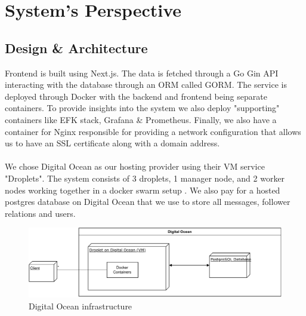 \section{System's Perspective}

\subsection{Design \& Architecture}
Frontend is built using Next.js\cite{nextjs}. The data is fetched through a Go Gin\cite{gin-gonic} API interacting with the database through an ORM called GORM\cite{gorm}. The service is deployed through Docker with the backend and frontend being separate containers. To provide insights into the system we also deploy "supporting" containers like EFK stack, Grafana \& Prometheus. Finally, we also have a container for Nginx responsible for providing a network configuration that allows us to have an SSL certificate along with a domain address.
\\\\
We chose Digital Ocean as our hosting provider using their VM service "Droplets". The system consists of 3 droplets, 1 manager node, and 2 worker nodes working together in a docker swarm setup . We also pay for a hosted postgres database on Digital Ocean that we use to store all messages, follower relations and users. 

\begin{figure}[h!]
    \centering
    \includegraphics[scale=0.6]{diagrams/infrastructure.pdf}
    \caption{Digital Ocean infrastructure}
    \label{fig:do_infrastructure}
\end{figure}

